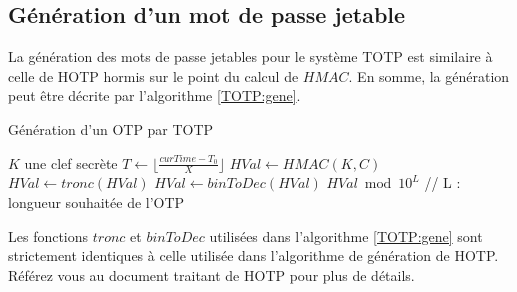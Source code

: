 \documentclass{../res/univ-projet}
\begin{document}
  \subsection{Génération d'un mot de passe jetable}
    La génération des mots de passe jetables pour le système \og{}TOTP\fg{} est similaire à celle de \og{}HOTP\fg{} hormis sur le point du calcul de $HMAC$. En somme, la 
    génération peut être décrite par l'algorithme \ref{TOTP:gene}.
    \begin{algorithm}
      \caption{Génération d'un OTP par TOTP}
      \label{TOTP:gene}
   
      \begin{algorithmic}
	\REQUIRE $K$ une clef secrète
	\STATE $T \leftarrow \lfloor{}\frac{curTime - T_0}{X}\rfloor{}$
	\STATE $HVal \leftarrow HMAC(K, C)$
	\STATE $HVal \leftarrow tronc(HVal)$
	\STATE $HVal \leftarrow binToDec(HVal)$
	\newline
	\RETURN $HVal \bmod 10^L$ // L : longueur souhaitée de l'OTP
      \end{algorithmic}
    \end{algorithm}
    
    Les fonctions $tronc$ et $binToDec$ utilisées dans l'algorithme \ref{TOTP:gene} sont strictement identiques à celle utilisée dans l'algorithme de génération de 
    \og{}HOTP\fg{}. Référez vous au document traitant de \og{}HOTP\fg{} pour plus de détails.
    
\end{document}
